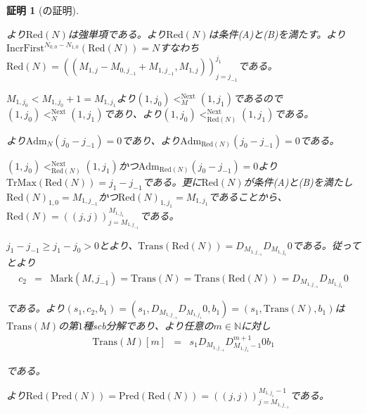 \documentclass[dvipdfmx,uplatex]{jsarticle}
\theoremstyle{customnonumberbreakfortheorem}
\theoremstyle{customnonumberbreakforproof}
\newtheorem{hideableproof}{証明}
\begin{document}
\begin{hideableproof}[の証明]
\begin{indented}
		\item {}より\(\textrm{Red}(N)\)は強単項である。より\(\textrm{Red}(N)\)は条件(A)と(B)を満たす。より\(\textrm{IncrFirst}^{N_{0,0}-N_{1,0}}(\textrm{Red}(N)) = N\)すなわち\(\textrm{Red}(N) = ((M_{1,j}-M_{0,j_{-1}}+M_{1,j_{-1}},M_{1,j}))_{j=j_{-1}}^{j_1}\)である。
		\item \(M_{1,j_0} < M_{1,j_0}+1 = M_{1,j_1}\)より\((1,j_0) <_M^{\textrm{Next}} (1,j_1)\)であるので\((1,j_0) <_N^{\textrm{Next}} (1,j_1)\)であり、より\((1,j_0) <_{\textrm{Red}(N)}^{\textrm{Next}} (1,j_1)\)である。
		\item {}より\(\textrm{Adm}_N(j_0-j_{-1}) = 0\)であり、より\(\textrm{Adm}_{\textrm{Red}(N)}(j_0-j_{-1}) = 0\)である。
		\item \((1,j_0) <_{\textrm{Red}(N)}^{\textrm{Next}} (1,j_1)\)かつ\(\textrm{Adm}_{\textrm{Red}(N)}(j_0-j_{-1}) = 0\)より\(\textrm{TrMax}(\textrm{Red}(N)) = j_1-j_{-1}\)である。更に\(\textrm{Red}(N)\)が条件(A)と(B)を満たし\(\textrm{Red}(N)_{1,0} = M_{1,j_{-1}}\)かつ\(\textrm{Red}(N)_{1,j_1} = M_{1,j_1}\)であることから、\(\textrm{Red}(N) = ((j,j))_{j=M_{1,j_{-1}}}^{M_{1,j_1}}\)である。
		\item \(j_1-j_{-1} \geq j_1-j_0 > 0\)とより、\(\textrm{Trans}(\textrm{Red}(N)) = D_{M_{1,j_{-1}}} D_{M_{1,j_1}} 0\)である。従ってとより
		\begin{eqnarray*}
		c_2 & = & \textrm{Mark}(M,j_{-1}) = \textrm{Trans}(N) = \textrm{Trans}(\textrm{Red}(N)) = D_{M_{1,j_{-1}}} D_{M_{1,j_1}} 0
		\end{eqnarray*}
		\item である。より\((s_1,c_2,b_1) = (s_1,D_{M_{1,j_{-1}}} D_{M_{1,j_1}} 0,b_1) = (s_1,\textrm{Trans}(N),b_1)\)は\(\textrm{Trans}(M)\)の第\(1\)種scb分解であり、より任意の\(m \in \mathbb{N}\)に対し
		\begin{eqnarray*}
		\textrm{Trans}(M)[m] & = & s_1 D_{M_{1,j_{-1}}} D_{M_{1,j_1}-1}^{m+1} 0 b_1
		\end{eqnarray*}
		\item である。
		\item
		\item {}より\(\textrm{Red}(\textrm{Pred}(N)) = \textrm{Pred}(\textrm{Red}(N)) = ((j,j))_{j=M_{1,j_{-1}}}^{M_{1,j_1}-1}\)である。

\end{indented}
\end{hideableproof}
\end{document}
